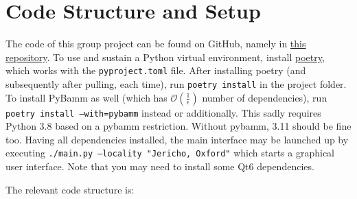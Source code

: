 \documentclass{prettytex/ox/mmsc-special-topic}
\begin{document}
  \pagebreak
  \printbibliography

  \pagebreak
  \appendix

  \section{Code Structure and Setup}
  \label{sec:code}
  The code of this group project can be found on GitHub, namely in \href{https://github.com/MrP01/BatteryModelling}{this repository}.
  To use and sustain a Python virtual environment, install
  \href{https://python-poetry.org/}{poetry}, which works with the
  \texttt{pyproject.toml} file. After installing poetry (and subsequently
  after pulling, each time), run
  \texttt{poetry install}
  in the project folder. To install PyBamm as well (which has $\mathcal{O}(\frac{1}{\epsilon})$ number of dependencies), run
  \texttt{poetry install --with=pybamm}
  instead or additionally. This sadly requires Python 3.8 based on a
  pybamm restriction. Without pybamm, 3.11 should be fine too.
  Having all dependencies installed, the main interface may be launched up
  by executing \texttt{./main.py --locality "Jericho, Oxford"}
  which starts a graphical user interface. Note that you may need to install some Qt6 dependencies.

  The relevant code structure is:
\end{document}
